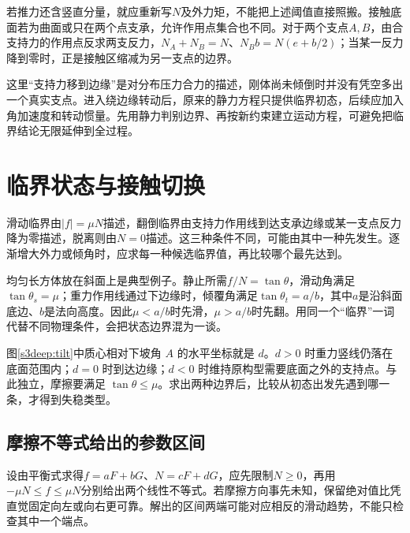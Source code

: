 若推力还含竖直分量，就应重新写$N$及外力矩，不能把上述阈值直接照搬。接触底面若为曲面或只在两个点支承，允许作用点集合也不同。对于两个支点$A,B$，由合支持力的作用点反求两支反力，$N_A+N_B=N$、$N_Bb=N(e+b/2)$；当某一反力降到零时，正是接触区缩减为另一支点的边界。

这里“支持力移到边缘”是对分布压力合力的描述，刚体尚未倾倒时并没有凭空多出一个真实支点。进入绕边缘转动后，原来的静力方程只提供临界初态，后续应加入角加速度和转动惯量。先用静力判别边界、再按新约束建立运动方程，可避免把临界结论无限延伸到全过程。

\section{临界状态与接触切换}
滑动临界由$|f|=\mu N$描述，翻倒临界由支持力作用线到达支承边缘或某一支点反力降为零描述，脱离则由$N=0$描述。这三种条件不同，可能由其中一种先发生。逐渐增大外力或倾角时，应求每一种候选临界值，再比较哪个最先达到。

均匀长方体放在斜面上是典型例子。静止所需$f/N=\tan\theta$，滑动角满足$\tan\theta_s=\mu$；重力作用线通过下边缘时，倾覆角满足$\tan\theta_t=a/b$，其中$a$是沿斜面底边、$b$是法向高度。因此$\mu<a/b$时先滑，$\mu>a/b$时先翻。用同一个“临界”一词代替不同物理条件，会把状态边界混为一谈。

图\ref{s3deep:tilt}中质心相对下坡角 $A$ 的水平坐标就是 $d$。$d>0$ 时重力竖线仍落在底面范围内；$d=0$ 时到达边缘；$d<0$ 时维持原构型需要底面之外的支持点。与此独立，摩擦要满足 $\tan\theta\le\mu$。求出两种边界后，比较从初态出发先遇到哪一条，才得到失稳类型。


\subsection{摩擦不等式给出的参数区间}
设由平衡式求得$f=aF+bG$、$N=cF+dG$，应先限制$N\ge0$，再用$-\mu N\le f\le\mu N$分别给出两个线性不等式。若摩擦方向事先未知，保留绝对值比凭直觉固定向左或向右更可靠。解出的区间两端可能对应相反的滑动趋势，不能只检查其中一个端点。

